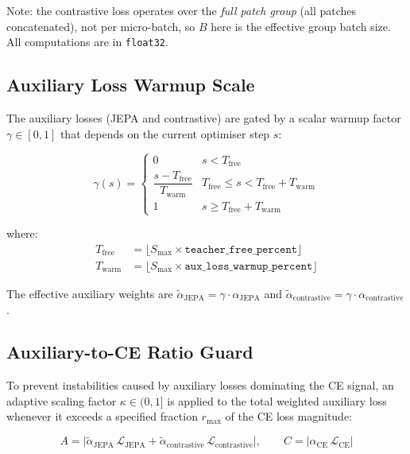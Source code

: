 \documentclass[11pt,a4paper]{article}
\begin{document}
Note: the contrastive loss operates over the \emph{full patch group} (all patches concatenated),
not per micro-batch, so $B$ here is the effective group batch size.  All computations are in
\texttt{float32}.

\subsection{Auxiliary Loss Warmup Scale}
\label{sec:aux_warmup}

The auxiliary losses (JEPA and contrastive) are gated by a scalar warmup factor $\gamma \in [0,1]$
that depends on the current optimiser step $s$:

\begin{equation}
  \gamma(s) =
  \begin{cases}
    0 & s < T_{\mathrm{free}} \\[4pt]
    \dfrac{s - T_{\mathrm{free}}}{T_{\mathrm{warm}}} & T_{\mathrm{free}} \le s < T_{\mathrm{free}} + T_{\mathrm{warm}} \\[8pt]
    1 & s \ge T_{\mathrm{free}} + T_{\mathrm{warm}}
  \end{cases}
\end{equation}

where:
\begin{align*}
  T_{\mathrm{free}} &= \lfloor S_{\max} \times \texttt{teacher\_free\_percent} \rfloor \\
  T_{\mathrm{warm}} &= \lfloor S_{\max} \times \texttt{aux\_loss\_warmup\_percent} \rfloor
\end{align*}

The effective auxiliary weights are $\tilde\alpha_{\mathrm{JEPA}} = \gamma \cdot \alpha_{\mathrm{JEPA}}$
and $\tilde\alpha_{\mathrm{contrastive}} = \gamma \cdot \alpha_{\mathrm{contrastive}}$.

\subsection{Auxiliary-to-CE Ratio Guard}

To prevent instabilities caused by auxiliary losses dominating the CE signal, an adaptive scaling
factor $\kappa \in (0, 1]$ is applied to the total weighted auxiliary loss whenever it exceeds a
specified fraction $r_{\max}$ of the CE loss magnitude:

\begin{equation}
  A = \bigl|\tilde\alpha_{\mathrm{JEPA}}\,\mathcal{L}_{\mathrm{JEPA}}
          + \tilde\alpha_{\mathrm{contrastive}}\,\mathcal{L}_{\mathrm{contrastive}}\bigr|, \qquad
  C = \bigl|\alpha_{\mathrm{CE}}\,\mathcal{L}_{\mathrm{CE}}\bigr|
\end{equation}
\end{document}
